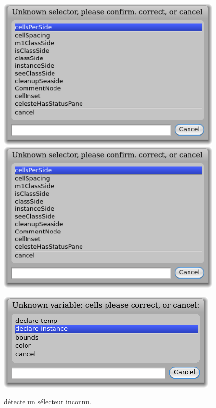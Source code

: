 \documentclass[a4paper,10pt,twoside]{book}
\begin{document}
\begin{figure}[htb]
\begin{minipage}{0.48\textwidth}
	\centering
	\ifluluelse
		{\includegraphics[width=\textwidth]{UnknownSelector}}
		{\includegraphics[scale=0.7]{UnknownSelector}}
	\caption{\pharo détecte un sélecteur inconnu.}
\end{minipage}
\hfill
\begin{minipage}{0.48\textwidth}
	\centering
	\ifluluelse
		{\includegraphics[width=\textwidth]{DeclareInstanceVar}}

\end{minipage}
\end{figure}
\end{document}
